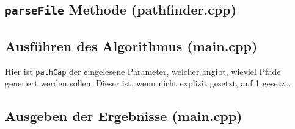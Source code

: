 \documentclass[a4paper,10pt,ngerman]{scrartcl}
\begin{document}
\subsection{\texttt{parseFile} Methode (pathfinder.cpp)}


\subsection{Ausführen des Algorithmus (main.cpp)}
Hier ist \texttt{pathCap} der eingelesene Parameter, welcher angibt, wieviel Pfade generiert werden sollen.
Dieser ist, wenn nicht explizit gesetzt, auf 1 gesetzt.


\subsection{Ausgeben der Ergebnisse (main.cpp)}

\end{document}
